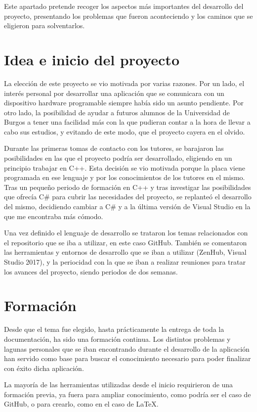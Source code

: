 
Este apartado pretende recoger los aspectos más importantes del desarrollo del proyecto, presentando los problemas que fueron aconteciendo y los caminos que se eligieron para solventarlos.

\section{Idea e inicio del proyecto}

La elección de este proyecto se vio motivada por varias razones. Por un lado, el interés personal por desarrollar una aplicación que se comunicara con un dispositivo hardware programable siempre había sido un asunto pendiente. Por otro lado, la posibilidad de ayudar a futuros alumnos de la Universidad de Burgos a tener una facilidad más con la que pudieran contar a la hora de llevar a cabo sus estudios, y evitando de este modo, que el proyecto cayera en el olvido.

Durante las primeras tomas de contacto con los tutores, se barajaron las posibilidades en las que el proyecto podría ser desarrollado, eligiendo en un principio trabajar en C++. Esta decisión se vio motivada porque la placa viene programada en ese lenguaje y por los conocimientos de los tutores en el mismo. Tras un pequeño periodo de formación en C++ y tras investigar las posibilidades que ofrecía C\# para cubrir las necesidades del proyecto, se replanteó el desarrollo del mismo, decidiendo cambiar a C\# y a la última versión de Visual Studio en la que me encontraba más cómodo.

Una vez definido el lenguaje de desarrollo se trataron los temas relacionados con el repositorio que se iba a utilizar, en este caso GitHub. También se comentaron las herramientas y entornos de desarrollo que se iban a utilizar (ZenHub, Visual Studio 2017), y la periocidad con la que se iban a realizar reuniones para tratar los avances del proyecto, siendo periodos de dos semanas.

\section{Formación}

Desde que el tema fue elegido, hasta prácticamente la entrega de toda la documentación, ha sido una formación continua. Los distintos problemas y lagunas personales que se iban encontrando durante el desarrollo de la aplicación han servido como base para buscar el conocimiento necesario para poder finalizar con éxito dicha aplicación.

La mayoría de las herramientas utilizadas desde el inicio requirieron de una formación previa, ya fuera para ampliar conocimiento, como podría ser el caso de GitHub, o para crearlo, como en el caso de \LaTeX.





